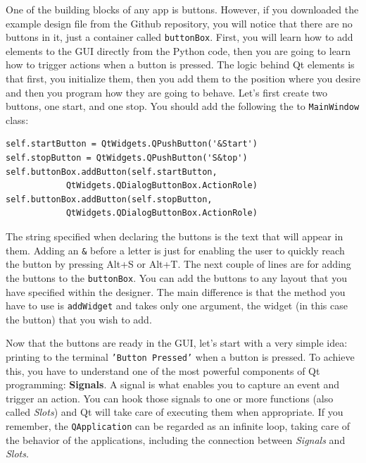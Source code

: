 One of the building blocks of any app is buttons. However, if you
downloaded the example design file from the Github repository, you will
notice that there are no buttons in it, just a container called
\texttt{buttonBox}. First, you will learn how to add elements to the
{GUI} directly from the Python code, then you are going to learn how to
trigger actions when a button is pressed. The logic behind Qt elements
is that first, you initialize them, then you add them to the position
where you desire and then you program how they are going to behave.
Let's first create two buttons, one start, and one stop. You should add
the following the to \texttt{MainWindow} class:

\begin{verbatim}
self.startButton = QtWidgets.QPushButton('&Start')
self.stopButton = QtWidgets.QPushButton('S&top')
self.buttonBox.addButton(self.startButton, 
            QtWidgets.QDialogButtonBox.ActionRole)
self.buttonBox.addButton(self.stopButton, 
            QtWidgets.QDialogButtonBox.ActionRole)
\end{verbatim}

The string specified when declaring the buttons is the text that will
appear in them. Adding an \texttt{\&} before a letter is just for
enabling the user to quickly reach the button by pressing Alt+S or Alt+T.
The next couple of lines are for adding the buttons to the
\texttt{buttonBox}. You can add the buttons to any layout that you have
specified within the designer. The main difference is that the method
you have to use is \texttt{addWidget} and takes only one argument, the
widget (in this case the button) that you wish to add.


Now that the buttons are ready in the {GUI}, let's start with a very
simple idea: printing to the terminal \texttt{'Button Pressed'} when a button
is pressed. To achieve this, you have to understand one of the most
powerful components of Qt programming: \textbf{Signals}. A signal is
what enables you to capture an event and trigger an action. You can hook
those signals to one or more functions (also called \emph{Slots}) and Qt
will take care of executing them when appropriate. If you remember, the
\texttt{QApplication} can be regarded as an infinite loop, taking care
of the behavior of the applications, including the connection between
\emph{Signals} and \emph{Slots}.

